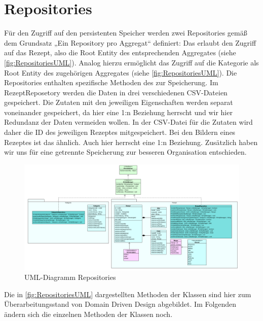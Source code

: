 \section{Repositories}
Für den Zugriff auf den persistenten Speicher werden zwei Repositories gemäß dem Grundsatz „Ein Repository pro Aggregat“ definiert: Das \href{https://github.com/MichaelaHaag/RezeptApp/tree/main/3-Domain-Code/src/main/java/de/rezeptapp/domain/Rezept/RezeptRepository.java}{} erlaubt den Zugriff auf das Rezept, also die Root Entity des entsprechenden Aggregates (siehe \autoref{fig:RepositoriesUML}). Analog hierzu ermöglicht das \href{https://github.com/MichaelaHaag/RezeptApp/blob/main/3-Domain-Code/src/main/java/de/rezeptapp/domain/Kategorie/KategorieRepository.java}{} Zugriff auf die Kategorie als Root Entity des zugehörigen Aggregates (siehe \autoref{fig:RepositoriesUML}). Die Repositories enthalten spezifische Methoden des  zur Speicherung. Im RezeptReposetory werden die Daten in drei verschiedenen CSV-Dateien gespeichert. Die Zutaten mit den jeweiligen Eigenschaften werden separat voneinander gespeichert, da hier eine 1:n Beziehung herrscht und wir hier Redundanz der Daten vermeiden wollen. In der CSV-Datei für die Zutaten wird daher die ID des jeweiligen Rezeptes mitgespeichert. Bei den Bildern eines Rezeptes ist das ähnlich. Auch hier herrscht eine 1:n Beziehung. Zusätzlich haben wir uns für eine getrennte Speicherung zur besseren Organisation entschieden. 

\begin{figure}[ht]
	\centering
	\includegraphics[width=1.0\textwidth]{Bilder/Reposetory-UML.png} 
	\caption{UML-Diagramm Repositories}
	\label{fig:RepositoriesUML}
\end{figure}
Die in \autoref{fig:RepositoriesUML} dargestellten Methoden der Klassen sind hier zum Überarbeitungsstand von Domain Driven Design abgebildet. Im Folgenden ändern sich die einzelnen Methoden der Klassen noch.  
